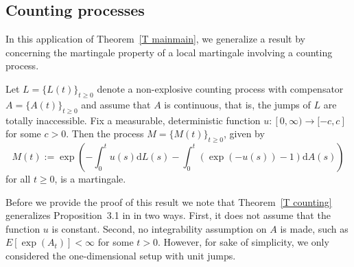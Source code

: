 \subsection{Counting processes}

In this application of Theorem~\ref{T mainmain}, we generalize a result by %
\citet{Giesecke_2013} concerning the martingale property of a local
martingale involving a counting process.

\begin{theorem}
\label{T counting} Let $L=\{L(t)\}_{t\geq 0}$ denote a non-explosive
counting process with compensator $A=\{A(t)\}_{t\geq 0}$ and assume that $A$
is continuous, that is, the jumps of $L$ are totally inaccessible. Fix a
measurable, deterministic function $u:[0,\infty )\rightarrow \lbrack -c,c]$
for some $c>0$. Then the process $M=\{M(t)\}_{t\geq 0}$, given by
\begin{equation*}
M(t):=\exp \left( -\int_{0}^{t}u(s)\mathrm{d}L(s)-\int_{0}^{t}\left( \exp
(-u(s))-1\right) \mathrm{d}A(s)\right) 
\end{equation*}%
for all $t\geq 0$, is a martingale.
\end{theorem}

Before we provide the proof of this result we note that Theorem~\ref{T
counting} generalizes Proposition~3.1 in \citet{Giesecke_2013} in two ways.
First, it does not assume that the function $u$ is constant. Second, no
integrability assumption on $A$ is made, such as $E[\exp (A_{t})]<\infty $
for some $t>0$. However, for sake of simplicity, we only considered the
one-dimensional setup with unit jumps.

